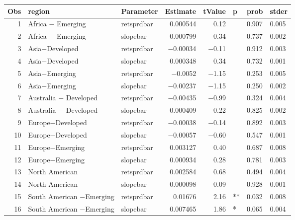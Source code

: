

\begin{longtable}{|r|l|l|r|r|l|l|l|}\hline
   Obs &    region &    Parameter &    Estimate &    tValue &    p &    prob &    stder\\\hline
\endhead
   1 &    Africa $-$ Emerging &    retsprdbar &    0.000544 &    0.12 &      &    0.907 &    0.005\\\hline
   2 &    Africa $-$ Emerging &    slopebar &    0.000799 &    0.34 &      &    0.737 &    0.002\\\hline
   3 &    Asia$-$Developed &    retsprdbar &    $-$0.00034 &    $-$0.11 &      &    0.912 &    0.003\\\hline
   4 &    Asia$-$Developed &    slopebar &    0.000348 &    0.34 &      &    0.732 &    0.001\\\hline
   5 &    Asia$-$Emerging &    retsprdbar &    $-$0.0052 &    $-$1.15 &      &    0.253 &    0.005\\\hline
   6 &    Asia$-$Emerging &    slopebar &    $-$0.00237 &    $-$1.15 &      &    0.250 &    0.002\\\hline
   7 &    Australia $-$ Developed &    retsprdbar &    $-$0.00435 &    $-$0.99 &      &    0.324 &    0.004\\\hline
   8 &    Australia $-$ Developed &    slopebar &    0.000409 &    0.22 &      &    0.825 &    0.002\\\hline
   9 &    Europe$-$Developed &    retsprdbar &    $-$0.00038 &    $-$0.14 &      &    0.892 &    0.003\\\hline
   10 &    Europe$-$Developed &    slopebar &    $-$0.00057 &    $-$0.60 &      &    0.547 &    0.001\\\hline
   11 &    Europe$-$Emerging &    retsprdbar &    0.003127 &    0.40 &      &    0.687 &    0.008\\\hline
   12 &    Europe$-$Emerging &    slopebar &    0.000934 &    0.28 &      &    0.781 &    0.003\\\hline
   13 &    North American &    retsprdbar &    0.002584 &    0.68 &      &    0.494 &    0.004\\\hline
   14 &    North American &    slopebar &    0.000098 &    0.09 &      &    0.928 &    0.001\\\hline
   15 &    South American $-$Emerging &    retsprdbar &    0.01676 &    2.16 &    ** &    0.032 &    0.008\\\hline
   16 &    South American $-$Emerging &    slopebar &    0.007465 &    1.86 &    * &    0.065 &    0.004\\\hline
\end{longtable}

